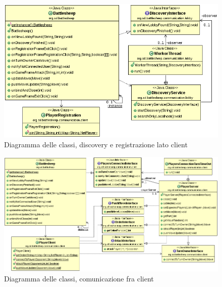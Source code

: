\begin{figure}[!ht]
    \centering
    \includegraphics[scale=0.60,center]{core/imgs/UML/RegistrationBattlesheepCommunicationUML-noattr.png}
    \caption{Diagramma delle classi, discovery e registrazione lato client}
    \label{fig:classregistration}
\end{figure}

\begin{figure}[!ht]
    \centering
    \includegraphics[scale=0.50,center]{core/imgs/UML/GameBattlesheepCommunicationUML-noattr.png}
    \caption{Diagramma delle classi, comunicazione fra client}
    \label{fig:classgame}
\end{figure}

